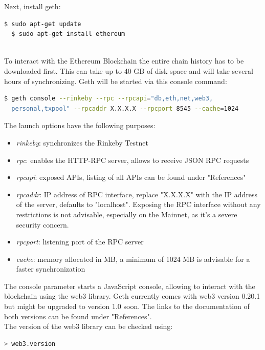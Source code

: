 Next, install geth:
\begin{lstlisting}[language=bash, numbers=none]
  $ sudo apt-get update
  $ sudo apt-get install ethereum
\end{lstlisting}
\leavevmode
\\
To interact with the Ethereum Blockchain the entire chain history has to be downloaded first. This can take up to 40 GB of disk space and will take several hours of synchronizing. Geth will be started via this console command:
\begin{lstlisting}[language=bash, showstringspaces=false, numbers=none]
  $ geth console --rinkeby --rpc --rpcapi="db,eth,net,web3,
  personal,txpool" --rpcaddr X.X.X.X --rpcport 8545 --cache=1024
\end{lstlisting}

The launch options have the following purposes\cite{cli-options}:
\begin{itemize}
    \item \textit{rinkeby}: synchronizes the Rinkeby Testnet
    \item \textit{rpc}: enables the HTTP-RPC server, allows to receive JSON RPC requests
    \item \textit{rpcapi}: exposed APIs, listing of all APIs can be found under "References"\cite{json-rpc}\cite{management-apis}
    \item \textit{rpcaddr}: IP address of RPC interface, replace "X.X.X.X" with the IP address of the server, defaults to "localhost". Exposing the RPC interface without any restrictions is not advisable, especially on the Mainnet, as it's a severe security concern.
    \item \textit{rpcport}: listening port of the RPC server
    \item \textit{cache}: memory allocated in MB, a minimum of 1024 MB is advisable for a faster synchronization
\end{itemize}
The console parameter starts a JavaScript console, allowing to interact with the blockchain using the web3 library. Geth currently comes with web3 version 0.20.1\cite{javascript-0.20} but might be upgraded to version 1.0\cite{javascript-1.0} soon. The links to the documentation of both versions can be found under "References".
\\
The version of the web3 library can be checked using:

\begin{lstlisting}[language=bash, numbers=none]
  > web3.version
\end{lstlisting}

